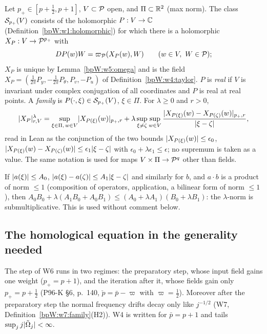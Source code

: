 \begin{definition}\label{bpW:w5:class}
Let $p_+\in[p+\frac12,p+1]$, $V\subset\mathcal P$ open, and $\Pi\subset\mathbb{R}^2$ (max norm). The class $\mathcal S_{p_+}(V)$ consists
of the holomorphic $P:V\to\mathbb{C}$ (Definition~\ref{bpW:w1:holomorphic}) for which there is a holomorphic
$X_P:V\to\mathcal P^{p_+}$ with
\[DP(w)W=\symp(X_P(w),W)\qquad(w\in V,\ W\in\Pc);\]
$X_P$ is unique by Lemma~\ref{bpW:w5:omega} and is the field $X_P=(\frac1{2\pi}P_y,-\frac1{2\pi}P_\theta,P_v,-P_u)$ of
Definition~\ref{bpW:w4:taylor}. $P$ is \emph{real} if $V$ is invariant under complex conjugation of all coordinates and
$P$ is real at real points. A \emph{family} is $P(\cdot,\xi)\in\mathcal S_{p_+}(V)$, $\xi\in\Pi$. For $\lambda\ge0$ and
$r>0$,
\[\lvert X_P\rvert^\lambda_{r,V}=\sup_{\xi\in\Pi,\,w\in V}\lvert X_{P(\xi)}(w)\rvert_{p_+,r}
+\lambda\sup_{\xi\ne\zeta}\sup_{w\in V}\frac{\lvert X_{P(\xi)}(w)-X_{P(\zeta)}(w)\rvert_{p_+,r}}{\lvert \xi-\zeta\rvert},\]
read in Lean as the conjunction of the two bounds $\lvert X_{P(\xi)}(w)\rvert\le\epsilon_0$,
$\lvert X_{P(\xi)}(w)-X_{P(\zeta)}(w)\rvert\le\epsilon_1\lvert \xi-\zeta\rvert$ with $\epsilon_0+\lambda\epsilon_1\le\epsilon$; no
supremum is taken as a value. The same notation is used for maps $V\times\Pi\to\mathcal P^{q}$ other than fields.
\end{definition}

\begin{remark}[Products]\label{bpW:w5:lambda-product}
If $\lvert a(\xi)\rvert\le A_0$, $\lvert a(\xi)-a(\zeta)\rvert\le A_1\lvert \xi-\zeta\rvert$ and similarly for $b$, and $a\cdot b$ is a
product of norm $\le1$ (composition of operators, application, a bilinear form of norm $\le1$), then
$A_0B_0+\lambda(A_1B_0+A_0B_1)\le(A_0+\lambda A_1)(B_0+\lambda B_1)$: the $\lambda$-norm is submultiplicative. This
is used without comment below.
\end{remark}

\subsection{The homological equation in the generality needed}\label{bpW:w5:w4-sec}

The step of W6 runs in two regimes: the preparatory step, whose input field gains one weight ($p_+=p+1$), and the
iteration after it, whose fields gain only $p_+=p+\frac12$ (P96-K \S6, p.~140, $\check p=\bar p-\varpi$ with
$\varpi=\frac12$). Moreover after the preparatory step the normal frequency drifts decay only like $j^{-1/2}$
(W7, Definition~\ref{bpW:w7:family}(H2)). W4 is written for $\bar p=p+1$ and tails $\sup_jj\lvert \tilde\Omega_j\rvert<\infty$.

